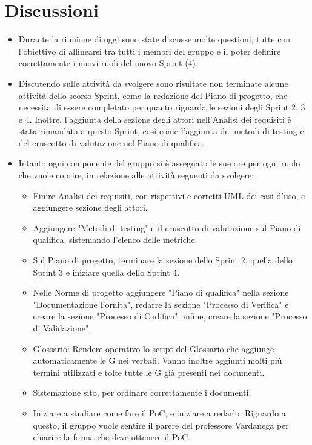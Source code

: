 \documentclass[a4paper,12pt]{article}
\begin{document}
\section{Discussioni}
\begin{itemize}
    \item Durante la riunione di oggi sono state discusse molte questioni, tutte con l'obiettivo di allinearsi tra tutti i membri del gruppo e il poter definire correttamente i nuovi ruoli del nuovo Sprint (4).
    \item Discutendo sulle attività da svolgere sono risultate non terminate alcune attività dello scorso Sprint, come la redazione del Piano di progetto, che necessita di essere completato per quanto riguarda le sezioni degli Sprint 2, 3 e 4. Inoltre, l'aggiunta della sezione degli attori nell'Analisi dei requisiti è stata rimandata a questo Sprint, così come l'aggiunta dei metodi di testing e del cruscotto di valutazione nel Piano di qualifica.
    \item Intanto ogni componente del gruppo si è assegnato le sue ore per ogni ruolo che vuole coprire, in relazione alle attività seguenti da svolgere:
    \begin{itemize}
        \item Finire Analisi dei requisiti, con rispettivi e corretti UML dei casi d'uso, e aggiungere sezione degli attori.
        \item Aggiungere "Metodi di testing" e il cruscotto di valutazione sul Piano di qualifica, sistemando l'elenco delle metriche.
        \item Sul Piano di progetto, terminare la sezione dello Sprint 2, quella dello Sprint 3 e iniziare quella dello Sprint 4.
        \item Nelle Norme di progetto aggiungere "Piano di qualifica" nella sezione "Documentazione Fornita", redarre la sezione "Processo di Verifica" e creare la sezione "Processo di Codifica". infine, creare la sezione "Processo di Validazione".
        \item Glossario: Rendere operativo lo script del Glossario che aggiunge automaticamente le G nei verbali. Vanno inoltre aggiunti molti più termini utilizzati e tolte tutte le G già presenti nei documenti.
        \item Sistemazione sito, per ordinare correttamente i documenti.
        \item Iniziare a studiare come fare il PoC, e iniziare a redarlo. Riguardo a questo, il gruppo vuole sentire il parere del professore Vardanega per chiarire la forma che deve ottenere il PoC.
    \end{itemize}
\end{itemize}
\end{document}
